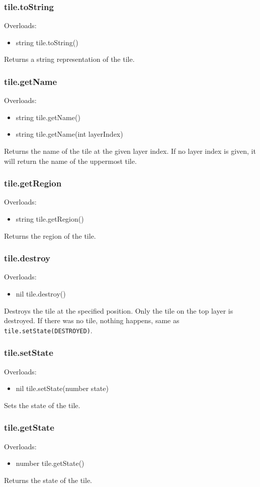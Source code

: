 \documentclass{book}
\newenvironment{ulist}
	{\begin{itemize}
			\itemsep0em}
	{\end{itemize}}
\begin{document}
\subsubsection{tile.toString}
Overloads:
\begin{ulist}
	\item string tile.toString()
\end{ulist}
Returns a string representation of the tile.

\subsubsection{tile.getName}
Overloads:
\begin{ulist}
	\item string tile.getName()
	\item string tile.getName(int layerIndex)
\end{ulist}
Returns the name of the tile at the given layer index. If no layer index is given, it will return the name of the uppermost tile.

\subsubsection{tile.getRegion}
Overloads:
\begin{ulist}
	\item string tile.getRegion()
\end{ulist}
Returns the region of the tile.

\subsubsection{tile.destroy}
Overloads:
\begin{ulist}
	\item nil tile.destroy()
\end{ulist}
Destroys the tile at the specified position. Only the tile on the top layer is destroyed. If there was no tile, nothing happens, same as \texttt{tile.setState(DESTROYED)}.

\subsubsection{tile.setState}
Overloads:
\begin{ulist}
	\item nil tile.setState(number state)
\end{ulist}
Sets the state of the tile.

\subsubsection{tile.getState}
Overloads:
\begin{ulist}
	\item number tile.getState()
\end{ulist}
Returns the state of the tile.
\end{document}
